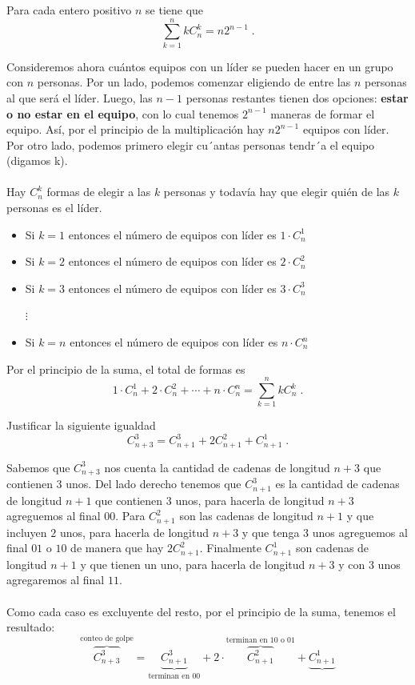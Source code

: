 \documentclass[12pt]{article}
\begin{document}
\begin{ejemplo}
    Para cada entero positivo $n$ se tiene que
    \[\sum_{k=1}^nkC^{k}_n=n2^{n-1}\;.\]
\end{ejemplo}
\begin{solucion}
Consideremos ahora cuántos equipos con un líder se pueden hacer en un grupo con $n$ personas. Por un lado, podemos comenzar eligiendo de entre las $n$ personas al que será el líder. Luego, las $n-1$ personas restantes tienen dos opciones: \textbf{estar o no estar en el equipo}, con lo cual tenemos $2^{n-1}$ maneras de formar el equipo. Así, por el principio de la multiplicación hay $n2^{n-1}$ equipos con líder. Por otro lado,
podemos primero elegir cu´antas personas tendr´a el equipo (digamos k).\\\\
Hay $C^k_n$ formas de elegir a las $k$ personas y todavía hay que elegir quién de las $k$ personas es el líder.
\begin{itemize}
    \item Si $k=1$ entonces el número de equipos con líder  es $1\cdot C^1_n$
    \item Si $k=2$ entonces el número de equipos con líder es $2\cdot C^2_n$
    \item Si $k=3$ entonces el número de equipos con líder es $3\cdot C^3_n$
    \begin{center}
        $\vdots$
    \end{center}
    \item Si $k=n$ entonces el número de equipos con líder es $n\cdot C^n_n$
\end{itemize}
Por el principio de la suma, el total de formas es
\[1\cdot C^1_n+2\cdot C^2_n+\cdots+n\cdot C^n_n=\sum_{k=1}^nkC^k_n\;.\]
\end{solucion}

\begin{ejemplo}
    Justificar la siguiente igualdad
    \[C^3_{n+3}=C^3_{n+1}+2C^2_{n+1}+C^1_{n+1}\;.\]
\end{ejemplo}

\begin{solucion}
    Sabemos que $C^3_{n+3}$ nos cuenta la cantidad de cadenas de longitud $n+3$ que contienen $3$ unos. Del lado derecho tenemos que $C^3_{n+1}$ es la cantidad de cadenas de longitud $n+1$ que contienen $3$ unos, para hacerla de longitud $n+3$ agreguemos al final $00$. Para $C^2_{n+1}$ son las
cadenas de longitud $n+1$ y que incluyen $2$ unos, para hacerla de longitud $n+3$ y que tenga $3$ unos agreguemos al final $01$ o $10$ de manera que hay $2C^2_{n+1}$. Finalmente $C^1_{n+1}$ son cadenas de longitud $n+1$ y que tienen un uno, para hacerla de longitud $n+3$ y con $3$ unos agregaremos al final $11$.\\\\
Como cada caso es excluyente del resto, por el principio de la suma, tenemos el resultado:
\[\overbrace{C^3_{n+3}}^{\text{conteo de golpe}}=\underbrace{C^3_{n+1}}_{\text{terminan en $00$}}+2\cdot \overbrace{C^2_{n+1}}^{\text{terminan en $10$ o $01$}}+\underbrace{C^1_{n+1}}\]
\end{solucion}
\end{document}
